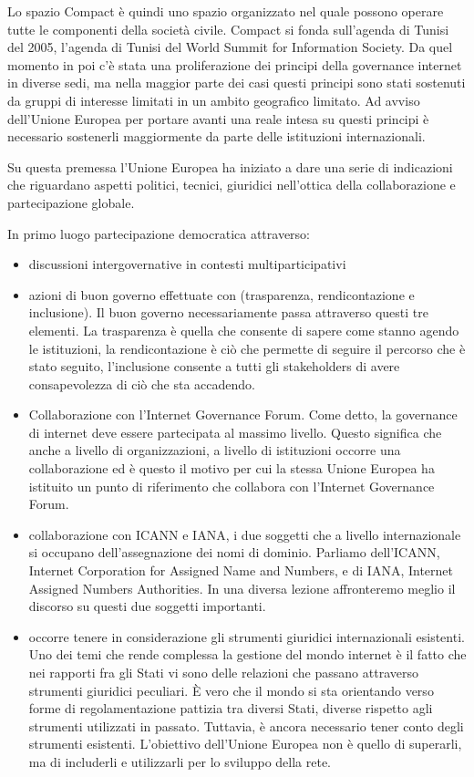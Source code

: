   \par
  Lo spazio Compact è quindi uno spazio organizzato nel quale possono operare tutte le componenti della società civile. Compact si fonda sull'agenda di Tunisi del 2005, l'agenda di Tunisi del World Summit for Information Society. Da quel momento in poi c'è stata una proliferazione dei principi della governance internet in diverse sedi, ma nella maggior parte dei casi questi principi sono stati sostenuti da gruppi di interesse limitati in un ambito geografico limitato. Ad avviso dell'Unione Europea per portare avanti una reale intesa su questi principi è necessario sostenerli maggiormente da parte delle istituzioni internazionali. \par
  Su questa premessa l'Unione Europea ha iniziato a dare una serie di indicazioni che riguardano aspetti politici, tecnici, giuridici nell'ottica della collaborazione e partecipazione globale. \par
  In primo luogo partecipazione democratica attraverso:
  \begin{itemize}
      \item discussioni intergovernative in contesti multiparticipativi
      \item  azioni di buon governo effettuate con (trasparenza, rendicontazione e inclusione). Il buon governo necessariamente passa attraverso questi tre elementi. La trasparenza è quella che consente di sapere come stanno agendo le istituzioni, la rendicontazione è ciò che permette di seguire il percorso che è stato seguito, l'inclusione consente a tutti gli stakeholders di avere consapevolezza di ciò che sta accadendo. 
      \item Collaborazione con l'Internet Governance Forum. Come detto, la governance di internet deve essere partecipata al massimo livello. Questo significa che anche a livello di organizzazioni, a livello di istituzioni occorre una collaborazione ed è questo il motivo per cui la stessa Unione Europea ha istituito un punto di riferimento che collabora con l'Internet Governance Forum. 
      \item collaborazione con ICANN e IANA, i due soggetti che a livello internazionale si occupano dell'assegnazione dei nomi di dominio. Parliamo dell'ICANN, Internet Corporation for Assigned Name and Numbers, e di IANA, Internet Assigned Numbers Authorities. In una diversa lezione affronteremo meglio il discorso su questi due soggetti importanti. 
      \item occorre tenere in considerazione gli strumenti giuridici internazionali esistenti. Uno dei temi che rende complessa la gestione del mondo internet è il fatto che nei rapporti fra gli Stati vi sono delle relazioni che passano attraverso strumenti giuridici peculiari. È vero che il mondo si sta orientando verso forme di regolamentazione pattizia tra diversi Stati, diverse rispetto agli strumenti utilizzati in passato. Tuttavia, è ancora necessario tener conto degli strumenti esistenti. L’obiettivo dell’Unione Europea non è quello di superarli, ma di includerli e utilizzarli per lo sviluppo della rete.
      \end{itemize}
